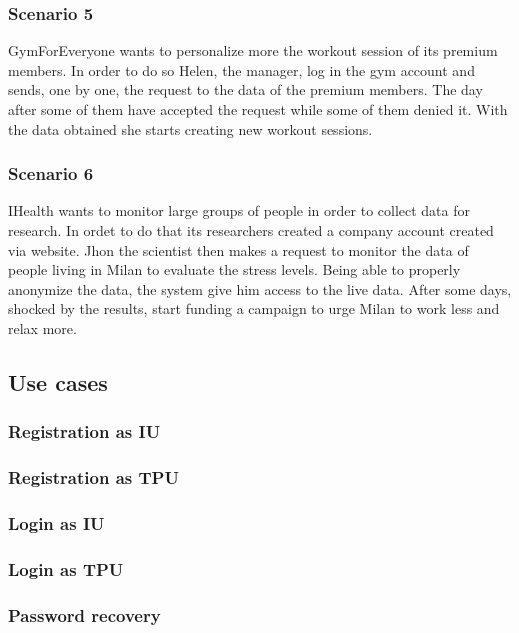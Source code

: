 \subsubsection{Scenario 5}
GymForEveryone wants to personalize more the workout session of its premium members. In order to do so Helen, the manager, log in the gym account and sends, one by one, the request to the data of the premium members. The day after some of them have accepted the request while some of them denied it. With the data obtained she starts creating new workout sessions.
\subsubsection{Scenario 6}
IHealth wants to monitor large groups of people in order to collect data for research. In ordet to do that its researchers created a company account created via website. Jhon the scientist then makes a request to monitor the data of people living in Milan to evaluate the stress levels. Being able to properly anonymize the data, the system give him access to the live data. After some days, shocked by the results, start funding a campaign to urge Milan to work less and relax more.
\clearpage


\subsection{Use cases}
\subsubsection{Registration as IU}

\clearpage
\subsubsection{Registration as TPU}

\clearpage
\subsubsection{Login as IU}

\clearpage
\subsubsection{Login as TPU}

\clearpage
\subsubsection{Password recovery}

\clearpage
